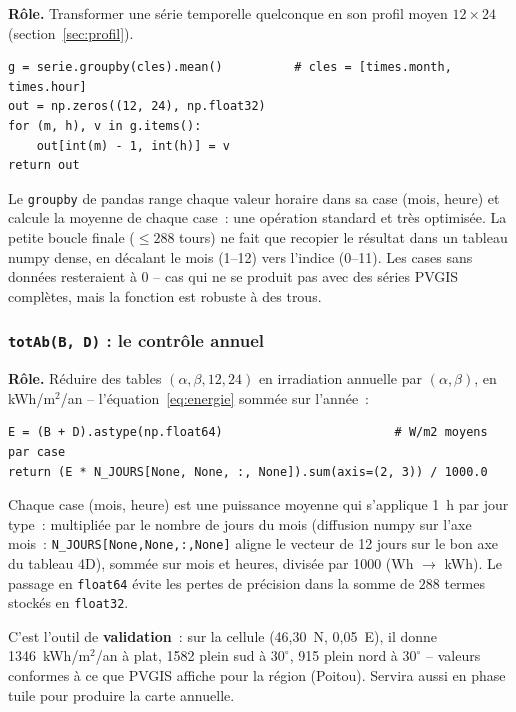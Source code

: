 \documentclass[11pt,a4paper]{article}
\newcommand{\fonction}[1]{\texttt{#1}}
\begin{document}
\textbf{Rôle.} Transformer une série temporelle quelconque en son profil moyen
$12 \times 24$ (section~\ref{sec:profil}).

\begin{lstlisting}
g = serie.groupby(cles).mean()          # cles = [times.month, times.hour]
out = np.zeros((12, 24), np.float32)
for (m, h), v in g.items():
    out[int(m) - 1, int(h)] = v
return out
\end{lstlisting}

Le \fonction{groupby} de pandas range chaque valeur horaire dans sa case (mois,
heure) et calcule la moyenne de chaque case~: une opération standard et très
optimisée. La petite boucle finale ($\leq 288$ tours) ne fait que recopier le
résultat dans un tableau numpy dense, en décalant le mois (1--12) vers l'indice
(0--11). Les cases sans données resteraient à 0 -- cas qui ne se produit pas
avec des séries PVGIS complètes, mais la fonction est robuste à des trous.

\subsubsection{\fonction{totAb(B, D)} : le contrôle annuel}
\label{sec:totAb}

\textbf{Rôle.} Réduire des tables $(\alpha, \beta, 12, 24)$ en irradiation
annuelle par $(\alpha, \beta)$, en kWh/m$^2$/an -- l'équation~\eqref{eq:energie}
sommée sur l'année~:

\begin{lstlisting}
E = (B + D).astype(np.float64)                        # W/m2 moyens par case
return (E * N_JOURS[None, None, :, None]).sum(axis=(2, 3)) / 1000.0
\end{lstlisting}

Chaque case (mois, heure) est une puissance moyenne qui s'applique 1~h par jour
type~: multipliée par le nombre de jours du mois (diffusion numpy sur l'axe
mois~: \fonction{N\_JOURS[None,None,:,None]} aligne le vecteur de 12 jours sur
le bon axe du tableau 4D), sommée sur mois et heures, divisée par 1000
(Wh $\to$ kWh). Le passage en \fonction{float64} évite les pertes de précision
dans la somme de $288$ termes stockés en \fonction{float32}.

C'est l'outil de \textbf{validation}~: sur la cellule (46{,}30~N, 0{,}05~E),
il donne 1346~kWh/m$^2$/an à plat, 1582 plein sud à $30^\circ$, 915 plein nord à
$30^\circ$ -- valeurs conformes à ce que PVGIS affiche pour la région
(Poitou). Servira aussi en phase tuile pour produire la carte annuelle.
\end{document}
